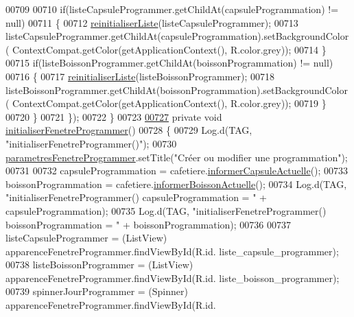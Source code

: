 \begin{DoxyCode}
00709 
00710                 \textcolor{keywordflow}{if}(listeCapsuleProgrammer.getChildAt(capsuleProgrammation) != null)
00711                 \{
00712                     \hyperlink{classcom_1_1example_1_1ekawa_1_1_ihm_a4c6ea5a7de9f8fc5c820fa4c8ce14838}{reinitialiserListe}(listeCapsuleProgrammer);
00713                     listeCapsuleProgrammer.getChildAt(capsuleProgrammation).setBackgroundColor(
      ContextCompat.getColor(getApplicationContext(), R.color.grey));
00714                 \}
00715                 \textcolor{keywordflow}{if}(listeBoissonProgrammer.getChildAt(boissonProgrammation) != null)
00716                 \{
00717                     \hyperlink{classcom_1_1example_1_1ekawa_1_1_ihm_a4c6ea5a7de9f8fc5c820fa4c8ce14838}{reinitialiserListe}(listeBoissonProgrammer);
00718                     listeBoissonProgrammer.getChildAt(boissonProgrammation).setBackgroundColor(
      ContextCompat.getColor(getApplicationContext(), R.color.grey));
00719                 \}
00720             \}
00721         \});
00722     \}
00723 
\hyperlink{classcom_1_1example_1_1ekawa_1_1_ihm_a08b1da8fdc68effff9a6da918e14d12d}{00727}     \textcolor{keyword}{private} \textcolor{keywordtype}{void} \hyperlink{classcom_1_1example_1_1ekawa_1_1_ihm_a08b1da8fdc68effff9a6da918e14d12d}{initialiserFenetreProgrammer}()
00728     \{
00729         Log.d(TAG, \textcolor{stringliteral}{"initialiserFenetreProgrammer()"});
00730         \hyperlink{classcom_1_1example_1_1ekawa_1_1_ihm_a6eb2afb2fe8da7f3a749089c84934145}{parametresFenetreProgrammer}.setTitle(\textcolor{stringliteral}{"Créer ou modifier une
       programmation"});
00731 
00732         capsuleProgrammation = cafetiere.\hyperlink{classcom_1_1example_1_1ekawa_1_1_cafetiere_a3251d1865f3a4113553e1743a971984d}{informerCapsuleActuelle}();
00733         boissonProgrammation = cafetiere.\hyperlink{classcom_1_1example_1_1ekawa_1_1_cafetiere_aa7022512d5a36d2b911722ae6400379f}{informerBoissonActuelle}();
00734         Log.d(TAG, \textcolor{stringliteral}{"initialiserFenetreProgrammer() capsuleProgrammation = "} + capsuleProgrammation);
00735         Log.d(TAG, \textcolor{stringliteral}{"initialiserFenetreProgrammer() boissonProgrammation = "} + boissonProgrammation);
00736 
00737         listeCapsuleProgrammer = (ListView) apparenceFenetreProgrammer.findViewById(R.id.
      liste\_capsule\_programmer);
00738         listeBoissonProgrammer = (ListView) apparenceFenetreProgrammer.findViewById(R.id.
      liste\_boisson\_programmer);
00739         spinnerJourProgrammer = (Spinner) apparenceFenetreProgrammer.findViewById(R.id.

\end{DoxyCode}
